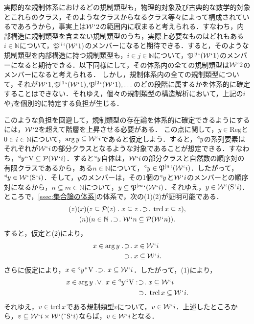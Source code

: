 実際的な規制体系におけるどの規制類型も，物理的対象及び古典的な数学的対象とこれらのクラス，そのようなクラスからなるクラス等々によって構成されているであろうから，事実上は$ \mathcal{W}{\mspace{1mu}{`}\mspace{1mu}} 2 $の範囲内に収まると考えられる．すなわち，内部構造に規制類型を含まない規制類型のうち，実際上必要なものはどれもある$i\in\mathbb{N}$について，$ \mathfrak{P}^{\mid i}{\mspace{1mu}{`}\mspace{1mu}}(\mathcal{W}{\mspace{1mu}{`}\mspace{1mu}} 1) $のメンバーになると期待できる．すると，そのような規制類型を内部構造に持つ規制類型も，$i\in j\in\mathbb{N}$について，$ \mathfrak{P}^{\mid j}{\mspace{1mu}{`}\mspace{1mu}}(\mathcal{W}{\mspace{1mu}{`}\mspace{1mu}} 1) $のメンバーになると期待できる．以下同様にして，その体系内の全ての規制類型は$ \mathcal{W}{\mspace{1mu}{`}\mspace{1mu}} 2 $のメンバーになると考えられる．
しかし，規制体系内の全ての規制類型について，それが$ \mathcal{W}{\mspace{1mu}{`}\mspace{1mu}} 1,\mathfrak{P}^{\mid 1}{\mspace{1mu}{`}\mspace{1mu}}(\mathcal{W}{\mspace{1mu}{`}\mspace{1mu}} 1),\mathfrak{P}^{\mid 2}{\mspace{1mu}{`}\mspace{1mu}}(\mathcal{W}{\mspace{1mu}{`}\mspace{1mu}} 1),\dots $のどの段階に属するかを体系的に確定することはできない．それゆえ，個々の規制類型の構造解析において，上記の$i$や$j$を個別的に特定する負担が生じる．

このような負担を回避して，規制類型の存在論を体系的に確定できるようにするには，$\mathcal{W}{\mspace{1mu}{`}\mspace{1mu}} 2$を超えて階層を上昇させる必要がある．
この点に関して，$y\in\mathrm{Reg}$と$0\in i\in\mathbb{N}$について，$\arg y\subseteq \mathcal{W}{\mspace{1mu}{`}\mspace{1mu}} i$であると仮定しよう．すると，${^\triangleleft}y$の系列要素はそれぞれが$\mathcal{W}{\mspace{1mu}{`}\mspace{1mu}} i$の部分クラスとなるような対象であることが想定できる．すなわち，$ {^\triangleleft}y{\mspace{1mu}{``}\mspace{1mu}}\mathrm{V}\subseteq \mathcal{P}(\mathcal{W}{\mspace{1mu}{`}\mspace{1mu}} i) $．すると${^\triangleleft}y$自体は，$\mathcal{W}{\mspace{1mu}{`}\mspace{1mu}} i$の部分クラスと自然数の順序対の有限クラスであるから，ある$n\in\mathbb{N}$について，$ {^\triangleleft}y\in\mathfrak{P}^{\mid n}{\mspace{1mu}{`}\mspace{1mu}}(\mathcal{W}{\mspace{1mu}{`}\mspace{1mu}} i) $．したがって，${^\triangleleft}y\in \mathcal{W}{\mspace{1mu}{`}\mspace{1mu}}(\mathrm{S}{\mspace{1mu}{`}\mspace{1mu}} i)$．そして，$ y $のメンバーは，その1個の${^\triangleleft}y$と$\mathcal{W}{\mspace{1mu}{`}\mspace{1mu}} i$のメンバーとの順序対になるから，$ n\subseteq m\in\mathbb{N} $について，$ y\subseteq \mathfrak{P}^{\mid m}{\mspace{1mu}{`}\mspace{1mu}}(\mathcal{W}{\mspace{1mu}{`}\mspace{1mu}} i) $．それゆえ，$y\in \mathcal{W}{\mspace{1mu}{`}\mspace{1mu}}(\mathrm{S}{\mspace{1mu}{`}\mspace{1mu}} i)$．
ところで，\ref{ssec:集合論の体系}の体系で，次の(1)(2)が証明可能である．
\setcounter{equation}{0}
\begin{gather}
    (z)(x)(z\subseteq\mathcal{P}(z)\con{1}x\subseteq z\case{1}{1}{1}\trcl x\subseteq z),\\
    (n)(n\in\mathbb{N}\case{1}{1}{1}\mathcal{W}\fap n\subseteq \mathcal{P}(\mathcal{W}\fap n)).
\end{gather}
すると，仮定と(2)により，
\begin{align*}
    x\in\arg y & \case{1}{1}{1}x\in \mathcal{W}\fap i\\
    &\:\,\case{1}{0}{1}x\subseteq \mathcal{W}\fap i.
\end{align*}
さらに仮定により，$ x\in \trgl{y}\img\univ\case{1}{1}{1}x\subseteq \mathcal{W}\fap i $．したがって，(1)により，
\begin{align*}
    x\in\arg y\case{2}{1}{1}x\in \trgl{y}\img\univ & \case{1}{2}{1}x\subseteq\mathcal{W}\fap i\\
    &\:\,\case{1}{0}{1}\trcl{x}\subseteq  \mathcal{W}\fap i.
\end{align*}
それゆえ，$v\in\operatorname{trcl} x$である規制類型$v$について，$v\in\mathcal{W}{\mspace{1mu}{`}\mspace{1mu}} i$．上述したところから，$ v\subseteq \mathcal{W}{\mspace{1mu}{`}\mspace{1mu}} i\times \mathcal{W}{\mspace{1mu}{`}\mspace{1mu}}(\breve{\:\:}\mathrm{S}{\mspace{1mu}{`}\mspace{1mu}} i) $ならば，$v\in\mathcal{W}{\mspace{1mu}{`}\mspace{1mu}} i $となる．

